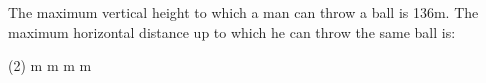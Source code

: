 \item The maximum vertical height to which a man can throw a ball is 136m. The maximum horizontal distance up to which he can throw the same ball is:
\begin{tasks}(2)
     m
     m
     m
     m
\end{tasks}
